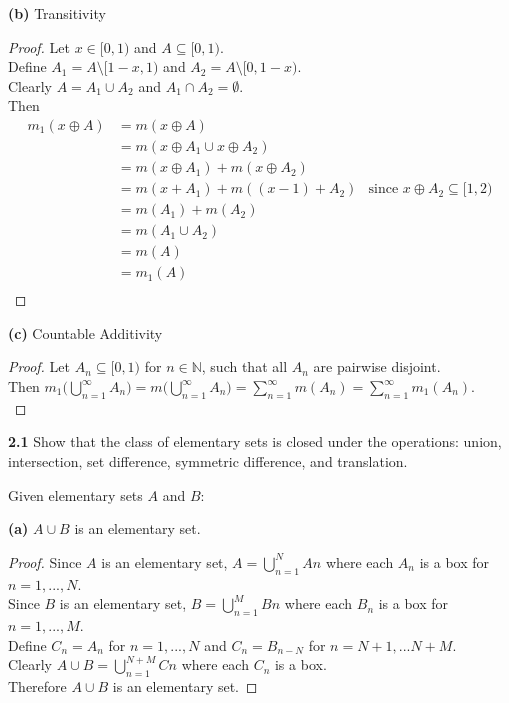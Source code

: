 \documentclass[12pt]{article}
\begin{document}
\hspace{-4 ex}\textbf{(b)} Transitivity

\begin{proof}
	Let $x \in [0,1)$ and $ A \subseteq [0,1)$. \\
	Define $A_{1}= A \setminus [1-x,1)$ and $A_{2} = A \setminus [0, 1-x)$. \\
	Clearly $A = A_{1} \cup A_{2}$ and $A_{1} \cap A_{2} = \emptyset$. \\
	Then 
	\begin{align*}
		m_{1}(x \oplus A) & = m(x \oplus A) \\
		& = m(x \oplus A_{1} \cup x \oplus A_{2}) \\
		& = m(x \oplus A_{1}) + m(x \oplus A_{2}) \\
		& = m(x + A_{1}) + m( (x-1) + A_{2}) & \text{since } x \oplus A_{2} \subseteq [1,2) \\
		& = m(A_{1}) + m(A_{2}) \\
		& = m(A_{1} \cup A_{2}) \\
		& = m(A) \\
		& = m_{1}(A) \\
	\end{align*} 
\end{proof}

\hspace{-4 ex}\textbf{(c)} Countable Additivity \\

\begin{proof}
	Let $A_{n} \subseteq [0,1)$ for $n \in \mathbb{N}$, such that all $A_{n}$ are pairwise disjoint. \\
	Then $m_{1}\big(\bigcup\limits_{n=1}^{\infty}A_{n}\big) = m \big(\bigcup\limits_{n=1}^{\infty}A_{n}\big) = \sum\limits_{n=1}^{\infty}m(A_{n}) = \sum\limits_{n=1}^{\infty}m_{1}(A_{n})$.\\
\end{proof}


\bigbreak

	\hspace{-4 ex}\textbf{2.1} Show that the class of elementary sets is closed under the operations: union, intersection, set difference, symmetric difference, and translation. \bigbreak
	
	Given elementary sets $A$ and $B$: \bigbreak
	
	\hspace{-4 ex}\textbf{(a)} $A \cup B$ is an elementary set.
	
	
	\begin{proof}
		Since $A$ is an elementary set, $A = \bigcup_{n=1}^{N} A{n}$ where each $A_{n}$ is a box for $n=1,...,N$. \\
		Since $B$ is an elementary set, $B = \bigcup_{n=1}^{M} B{n}$ where each $B_{n}$ is a box for $n=1,...,M$. \\
		Define $C_{n} = A_{n}$ for $n=1,...,N$ and $C_{n} = B_{n-N}$ for $n=N+1,...N+M$. \\
		Clearly $A \cup B = \bigcup_{n=1}^{N+M} C{n}$ where each $C_{n}$ is a box. \\
		Therefore $A \cup B$ is an elementary set.
	\end{proof}
\end{document}
